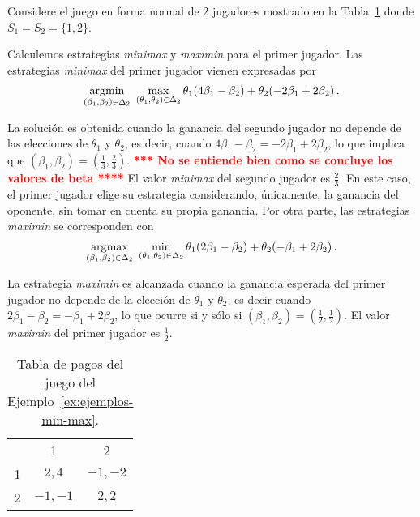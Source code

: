 \begin{example}
\label{ex:ejemplos-min-max}
Considere el juego en forma normal de $2$ jugadores mostrado en la Tabla~\ref{table:ejemplos-min-max} donde $S_1 = S_2 = \{1, 2\}$.
\end{example}

Calculemos estrategias \textit{minimax} y \textit{maximin} para el primer jugador. Las estrategias \textit{minimax} del primer jugador vienen expresadas por
\begin{alignat}{1}
\operatorname*{\arg\!\min}_{(\beta_1, \beta_2) \in \Delta_2 }\ {\max_{(\theta_1, \theta_2) \in \Delta_2}
{\theta_1(4\beta_1 -\beta_2) + \theta_2(-2\beta_1 + 2\beta_2)}} \,.
\end{alignat}

La solución es obtenida cuando la ganancia del segundo jugador no depende de las elecciones de $\theta_1$ y $\theta_2$, es decir, cuando $4\beta_1 - \beta_2 = -2\beta_1 + 2\beta_2$, lo que implica que $(\beta_1, \beta_2) = \left(\frac{1}{3}, \frac{2}{3} \right)$. 
\textcolor{red}{\bf **** No se entiende bien como se concluye los valores de beta ****}
El valor \textit{minimax} del segundo jugador es $\frac{2}{3}$. En este caso, el primer jugador elige su estrategia considerando, únicamente, la ganancia del oponente, sin tomar en cuenta su propia ganancia.
Por otra parte, las estrategias \textit{maximin} se corresponden con
\begin{alignat}{1}
\operatorname*{\arg\!\max}_{(\beta_1, \beta_2) \in \Delta_2 }\ {\min_{(\theta_1, \theta_2) \in \Delta_2}
{\theta_1(2\beta_1 -\beta_2) + \theta_2(-\beta_1 + 2\beta_2)}} \,.
\end{alignat}

La estrategia \textit{maximin} es alcanzada cuando la ganancia esperada del primer jugador no depende de la elección de $\theta_1$ y $\theta_2$, es decir cuando $2\beta_1 - \beta_2 = -\beta_1 + 2\beta_2$, lo que ocurre si y sólo si $(\beta_1, \beta_2) = \left(\frac{1}{2}, \frac{1}{2}\right)$. El valor \textit{maximin} del primer jugador es $\frac{1}{2}$.

\begin{table}[t]
\begin{center}
\caption{Tabla de pagos del juego del Ejemplo~\ref{ex:ejemplos-min-max}.}
\label{table:ejemplos-min-max}
\begin{tabular}{ r | c | c |}
 \multicolumn{1}{c}{} & \multicolumn{1}{c}{1} & \multicolumn{1}{c}{2}  \\ \cline{2-3}
 1 & $2, 4$ & $-1, -2$ \\ \cline{2-3}
 2 & $-1, -1$ & $2, 2$ \\ \cline{2-3}
\end{tabular}
\end{center}
\end{table}


